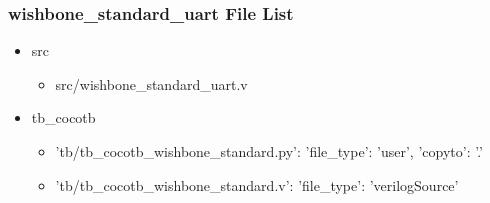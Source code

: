\subsubsection{wishbone\_standard\_uart File List}
\begin{itemize}
\item src
	\begin{itemize}
	\item src/wishbone\_standard\_uart.v
	\end{itemize}
\item tb\_cocotb
	\begin{itemize}
	\item {'tb/tb\_cocotb\_wishbone\_standard.py': {'file\_type': 'user', 'copyto': '.'}}
	\item {'tb/tb\_cocotb\_wishbone\_standard.v': {'file\_type': 'verilogSource'}}
	\end{itemize}
\end{itemize}
